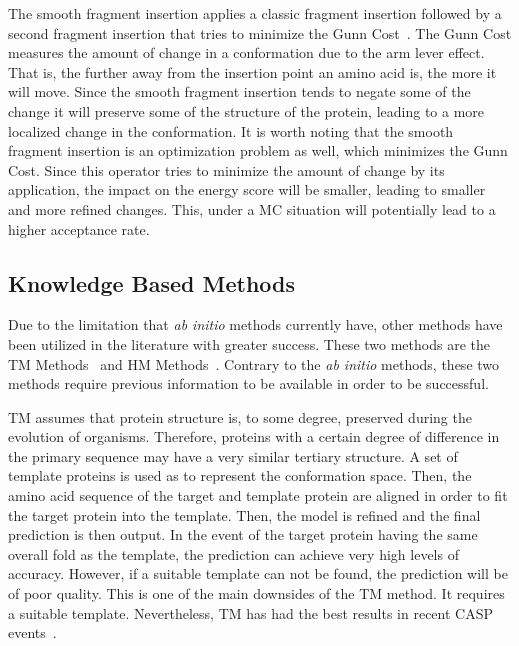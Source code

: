 The smooth fragment insertion applies a classic fragment insertion followed by
a second fragment insertion that tries to minimize the Gunn
Cost~\cite{gunn1997sampling}. The Gunn Cost measures the amount of change in a
conformation due to the arm lever effect. That is, the further away from the
insertion point an amino acid is, the more it will move. Since the smooth
fragment insertion tends to negate some of the change it will preserve some of
the structure of the protein, leading to a more localized change in the
conformation. It is worth noting that the smooth fragment insertion is an
optimization problem as well, which minimizes the Gunn Cost.  Since this
operator tries to minimize the amount of change by its application, the impact
on the energy score will be smaller, leading to smaller and more refined
changes. This, under a \ac{MC} situation will potentially lead to a higher
acceptance rate.

\subsection{Knowledge Based Methods}

Due to the limitation that \textit{ab initio} methods currently have, other
methods have been utilized in the literature with greater success. These two
methods are the \ac{TM} Methods~\cite{dorn2014three} and \ac{HM}
Methods~\cite{leach2001molecular}. Contrary to the \textit{ab initio} methods,
these two methods require previous information to be available in order to be
successful.

\ac{TM} assumes that protein structure is, to some degree, preserved during the
evolution of organisms. Therefore, proteins with a certain degree of difference
in the primary sequence may have a very similar tertiary structure. A set of
template proteins is used as to represent the conformation space. Then, the
amino acid sequence of the target and template protein are aligned in order to
fit the target protein into the template. Then, the model is refined and the
final prediction is then output. In the event of the target protein having the
same overall fold as the template, the prediction can achieve very high levels
of accuracy. However, if a suitable template can not be found, the prediction
will be of poor quality. This is one of the main downsides of the \ac{TM}
method. It requires a suitable template. Nevertheless, \ac{TM} has had the best
results in recent \ac{CASP} events~\cite{moult2018critical}.

